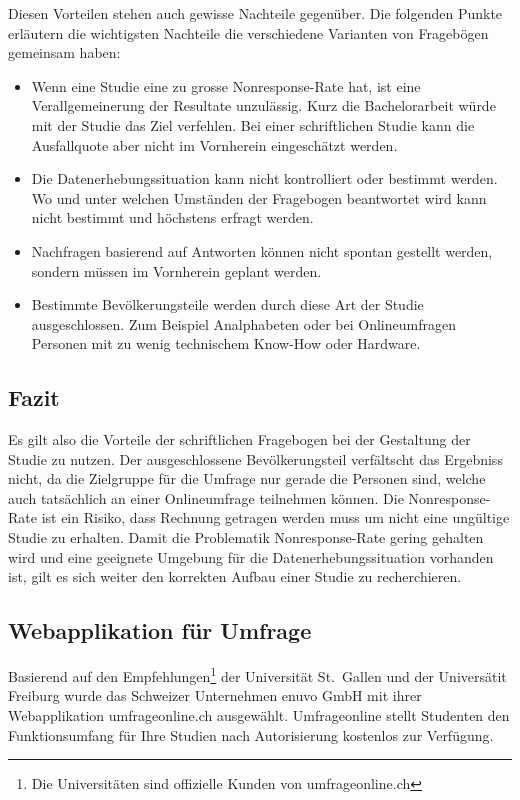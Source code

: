 Diesen Vorteilen stehen auch gewisse Nachteile gegenüber. Die folgenden
Punkte erläutern die wichtigsten Nachteile die verschiedene Varianten
von Fragebögen gemeinsam haben:

\begin{itemize}
\tightlist
\item
  Wenn eine Studie eine zu grosse Nonresponse-Rate hat, ist eine
  Verallgemeinerung der Resultate unzulässig. Kurz die Bachelorarbeit
  würde mit der Studie das Ziel verfehlen. Bei einer schriftlichen
  Studie kann die Ausfallquote aber nicht im Vornherein eingeschätzt
  werden.
\item
  Die Datenerhebungssituation kann nicht kontrolliert oder bestimmt
  werden. Wo und unter welchen Umständen der Fragebogen beantwortet wird
  kann nicht bestimmt und höchstens erfragt werden.
\item
  Nachfragen basierend auf Antworten können nicht spontan gestellt
  werden, sondern müssen im Vornherein geplant werden.
\item
  Bestimmte Bevölkerungsteile werden durch diese Art der Studie
  ausgeschlossen. Zum Beispiel Analphabeten oder bei Onlineumfragen
  Personen mit zu wenig technischem Know-How oder Hardware.
\end{itemize}

\newpage

\subsection{Fazit}\label{fazit-1}

Es gilt also die Vorteile der schriftlichen Fragebogen bei der
Gestaltung der Studie zu nutzen. Der ausgeschlossene Bevölkerungsteil
verfältscht das Ergebniss nicht, da die Zielgruppe für die Umfrage nur
gerade die Personen sind, welche auch tatsächlich an einer Onlineumfrage
teilnehmen können. Die Nonresponse-Rate ist ein Risiko, dass Rechnung
getragen werden muss um nicht eine ungültige Studie zu erhalten. Damit
die Problematik Nonresponse-Rate gering gehalten wird und eine geeignete
Umgebung für die Datenerhebungssituation vorhanden ist, gilt es sich
weiter den korrekten Aufbau einer Studie zu recherchieren.

\subsection{Webapplikation für
Umfrage}\label{webapplikation-fuxfcr-umfrage}

Basierend auf den Empfehlungen\footnote{Die Universitäten sind
  offizielle Kunden von umfrageonline.ch} der Universität St.~Gallen und
der Universätit Freiburg wurde das Schweizer Unternehmen enuvo GmbH mit
ihrer Webapplikation umfrageonline.ch ausgewählt. Umfrageonline stellt
Studenten den Funktionsumfang für Ihre Studien nach Autorisierung
kostenlos zur Verfügung.

